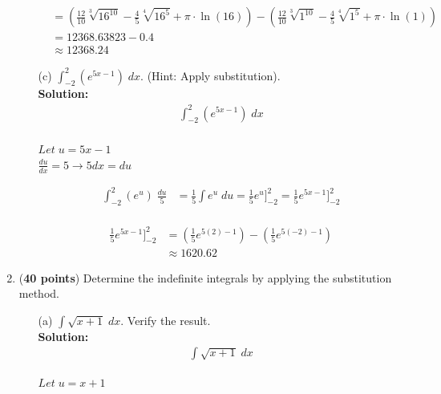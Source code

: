\documentclass[a4paper]{article}
\begin{document}
\begin{enumerate}
\begin{enumerate}
\begin{align*}
&= (\frac{12}{10} \sqrt[3]{16^{10}} - \frac{4}{5} \sqrt[4]{16^5} + \pi \cdot \ln(16))-(\frac{12}{10} \sqrt[3]{1^{10}} - \frac{4}{5} \sqrt[4]{1^5} + \pi \cdot \ln(1))\\
&= 12368.63823 - 0.4\\
&\approx 12368.24
\end{align*}	
	
	
	
	
	\item[(c)] $\int_{-2}^2(e^{5x-1}) \; dx$. (Hint: Apply substitution).\\
	\textbf{Solution:}\\

\begin{align*}
	\int_{-2}^2(e^{5x-1}) \; dx \\
\end{align*}

$Let \; u = 5x - 1$\\ 

$\frac{du}{dx} = 5 \rightarrow 5dx = du$	

\begin{align*}
	\int_{-2}^2(e^{u}) \; \frac{du}{5} &= \frac{1}{5}\int e^u \; du = \frac{1}{5} e^u \Bigg]_{-2}^2 = \frac{1}{5}e^{5x-1} \Bigg]_{-2}^2\\
\end{align*}
	
\begin{align*}
\frac{1}{5}e^{5x-1} \Bigg]_{-2}^2 &= (\frac{1}{5}e^{5(2)-1})-(\frac{1}{5}e^{5(-2)-1})\\
&\approx 1620.62
\end{align*}	
	
	
	
\end{enumerate}


\item (\textbf{40 points}) Determine the indefinite integrals by applying the substitution method.

\begin{enumerate}
	\item[(a)] $\int \sqrt{x + 1} \; dx$. Verify the result.\\
	\textbf{Solution:}\\	
	
	
\begin{align*}
	\int \sqrt{x + 1} \; dx
\end{align*}	
	
$Let \; u = x+1$\\ 


\end{enumerate}
\end{enumerate}
\end{document}
